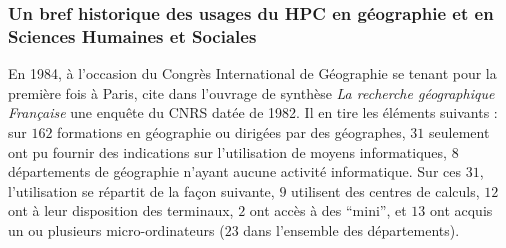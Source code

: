 


\subsubsection{Un bref historique des usages du HPC en géographie et en Sciences Humaines et Sociales}
\label{sssec:histo_centrecalcul}



En 1984, à l'occasion du Congrès International de Géographie se tenant pour la première fois à Paris, \textcite{Faugieres1984} cite dans l'ouvrage de synthèse \textit{La recherche géographique Française} une enquête du CNRS datée de 1982. Il en tire les éléments suivants : sur $162$ formations en géographie ou dirigées par des géographes, $31$ seulement ont pu fournir des indications sur l'utilisation de moyens informatiques, $8$ départements de géographie n'ayant aucune activité informatique. Sur ces $31$, l'utilisation se répartit de la façon suivante, $9$ utilisent des centres de calculs, $12$ ont à leur disposition des terminaux, $2$ ont accès à des \enquote{mini}, et $13$ ont acquis un ou plusieurs micro-ordinateurs ($23$ dans l'ensemble des départements).

